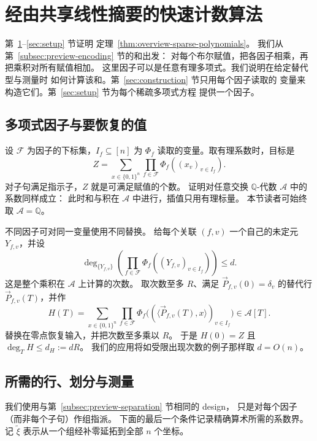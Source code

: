 \section{经由共享线性摘要的快速计数算法}\label{sec:counting}
第~\ref{sec:counting}--\ref{sec:setup} 节证明
定理~\ref{thm:overview-sparse-polynomials}。
我们从第~\ref{subsec:preview-encoding} 节的和出发：
对每个布尔赋值，把各因子相乘，再把乘积对所有赋值相加。
这里因子可以是任意有理多项式。我们说明在给定替代型与测量时
如何计算该和。第~\ref{sec:construction} 节只用每个因子读取的
变量来构造它们。第~\ref{sec:setup} 节为每个稀疏多项式方程
提供一个因子。

\subsection{多项式因子与要恢复的值}
\label{subsec:product-interface}
设 $\mathcal F$ 为因子的下标集，$I_f\subseteq[n]$ 为 $\Phi_f$
读取的变量。取有理系数时，目标是
\begin{equation}\label{eq:general-product-sum}
 Z=\sum_{x\in\{0,1\}^n}\prod_{f\in\mathcal F}\Phi_f((x_v)_{v\in I_f}).
\end{equation}
对子句满足指示子，$Z$ 就是可满足赋值的个数。
证明对任意交换 $\mathbb Q$-代数 $\mathcal A$ 中的系数同样成立：
此时和与积在 $\mathcal A$ 中进行，插值只用有理标量。
本节读者可始终取 $\mathcal A=\mathbb Q$。

不同因子可对同一变量使用不同替换。
给每个关联 $(f,v)$ 一个自己的未定元 $Y_{f,v}$，并设
\begin{equation}\label{eq:general-product-degree}
 \deg_{\{Y_{f,v}\}}\!
    \left(\prod_{f\in\mathcal F}\Phi_f((Y_{f,v})_{v\in I_f})\right)\le d .
\end{equation}
这是整个乘积在 $\mathcal A$ 上计算的次数。
取次数至多 $R$、满足 $\vec P_{f,v}(0)=\delta_v$ 的替代行
$\vec P_{f,v}(T)$，并作
\begin{equation}\label{eq:general-count-polynomial}
 H(T)=\sum_{x\in\{0,1\}^n}\prod_{f\in\mathcal F}
   \Phi_f\bigl((\langle\vec P_{f,v}(T),x\rangle)_{v\in I_f}\bigr)
   \in\mathcal A[T].
\end{equation}
替换在零点恢复输入，并把次数至多乘以 $R$。
于是 $H(0)=Z$ 且 $\deg_T H\le d_H:=dR$。
我们的应用将如受限出现次数的例子那样取 $d=O(n)$。

\subsection{所需的行、划分与测量}
\label{subsec:layout-interface}
我们使用与第~\ref{subsec:preview-separation} 节相同的 design，
只是对每个因子（而非每个子句）作组指派。
下面的最后一个条件记录精确算术所需的系数界。
记 $\widetilde\xi$ 表示从一个组经补零延拓到全部 $n$ 个坐标。


